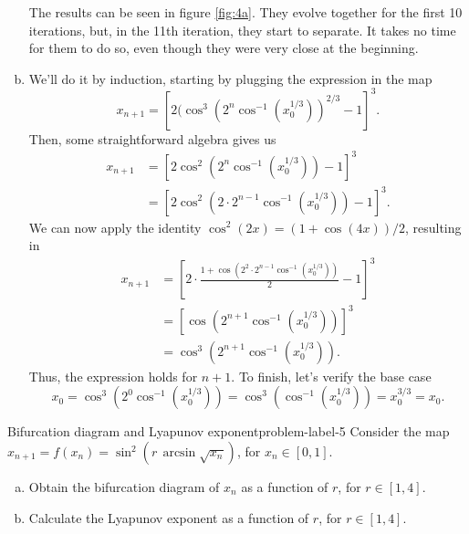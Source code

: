 \begin{enumerate}[(a)]
    The results can be seen in figure \ref{fig:4a}. They evolve together
    for the first 10 iterations, but, in the 11th iteration, they start to separate. 
    It takes no time for them to do so, even though they were very close
    at the beginning. 


    \item We'll do it by induction, starting by plugging the expression in the map
    \[
        x_{n+1} = [2(\cos^3 (2^n \cos^{-1} (x_0^{1/3}))^{2/3} - 1]^3.
    \]
    Then, some straightforward algebra gives us
    \[
    \begin{aligned}
        x_{n+1} &= [2\cos^2 (2^n \cos^{-1} (x_0^{1/3})) - 1]^3\\
        &= [2\cos^2 (2\cdot 2^{n-1} \cos^{-1} (x_0^{1/3})) - 1]^3.
    \end{aligned}
    \]
    We can now apply the identity $\cos^2(2x)=(1+\cos(4x))/2$,
    resulting in
    \[
    \begin{aligned}
        x_{n+1} &= \left[2\cdot\frac{1 + \cos(2^2\cdot 2^{n-1} \cos^{-1} (x_0^{1/3}))}{2}-1\right]^3\\
        &= \left[\cos(2^{n+1} \cos^{-1} (x_0^{1/3}))\right]^3\\
        &= \cos^3 (2^{n+1} \cos^{-1} (x_0^{1/3})).
    \end{aligned}
    \]
    Thus, the expression holds for $n+1$. To finish, let's verify the base case
    \[
        x_0 = \cos^3 (2^0 \cos^{-1} (x_0^{1/3})) = \cos^3 (\cos^{-1} (x_0^{1/3})) = x_0^{3/3} = x_0.
    \]


\end{enumerate}

\begin{problem}{Bifurcation diagram and Lyapunov exponent}{problem-label-5}
    Consider the map $x_{n+1} = f(x_n) = \sin^2(r\,\arcsin{\sqrt{x_n}})$, for $x_n \in [0, 1]$.

    \begin{enumerate}[(a)]
        \item Obtain the bifurcation diagram of $x_n$ as a function of $r$,
        for $r \in [1, 4]$.
        \item Calculate the Lyapunov exponent as a function of $r$, for $r \in [1, 4]$.
    \end{enumerate}

\end{problem}

